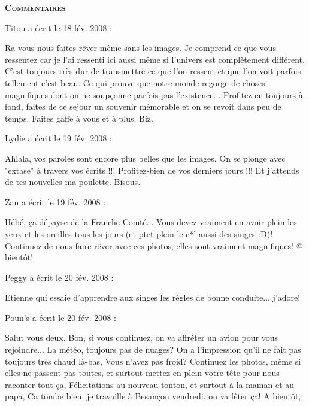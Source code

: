 \bigskip
\textbf{\textsc{Commentaires}}

\medskip
Titou a écrit le 18 fév. 2008 :
\begin{displayquote}
Ra vous nous faites rêver même sans les images. Je comprend ce que vous ressentez car je l'ai ressenti ici aussi même si l'univers est complètement différent. C'est toujours très dur de transmettre ce que l'on ressent et que l'on voit parfois tellement c'est beau. Ce qui prouve que notre monde regorge de choses magnifiques dont on ne soupçonne parfois pas l'existence... Profitez en toujours à fond, faites de ce sejour un souvenir mémorable et on se revoit dans peu de temps. Faites gaffe à vous et à plus. Biz.
\end{displayquote}

\medskip
Lydie a écrit le 19 fév. 2008 :
\begin{displayquote}
Ahlala, vos paroles sont encore plus belles que les images. On se plonge avec "extase" à travers vos écrits !!!
Profitez-bien de vos derniers jours !!! Et j'attends de tes nouvelles ma poulette. Bisous.
\end{displayquote}

\medskip
Zan a écrit le 19 fév. 2008 :
\begin{displayquote}
Hébé, ça dépayse de la Franche-Comté...
Vous devez vraiment en avoir plein les yeux et les oreilles tous les jours (et ptet plein le c*l aussi des singes :D)!
Continuez de nous faire rêver avec ces photos, elles sont vraiment magnifiques!
@ bientôt!
\end{displayquote}

\medskip
Peggy a écrit le 20 fév. 2008 :
\begin{displayquote}
Etienne qui essaie d'apprendre aux singes les règles de bonne conduite... j'adore!
\end{displayquote}

\medskip
Poun's a écrit le 20 fév. 2008 :
\begin{displayquote}
Salut vous deux. Bon, si vous continuez, on va affréter un avion pour vous rejoindre...
La météo, toujours pas de nuages? On a l'impression qu'il ne fait pas toujours très chaud là-bas, Vous n'avez pas froid?
Continuez les photos, même si elles ne passent pas toutes, et surtout mettez-en plein votre tête pour nous raconter tout ça,
Félicitations au nouveau tonton, et surtout à la maman et au papa,
Ca tombe bien, je travaille à Besançon vendredi, on va fêter ça!
A bientôt,
\end{displayquote}

